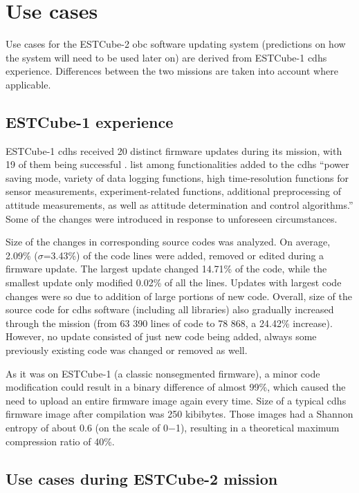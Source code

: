 \newpage
\section{Use cases}
\label{s:usecases}

Use cases for the ESTCube-2 \gls{obc} software updating system (predictions on how the system will need to be used later on) are derived from ESTCube-1 \gls{cdhs} experience. Differences between the two missions are taken into account where applicable.

\subsection{ESTCube-1 experience}

ESTCube-1 \gls{cdhs} received 20 distinct firmware updates during its mission, with 19 of them being successful \cite{Suenter2016}. \textcite{Slavinskis2015} list among functionalities added to the \gls{cdhs} ``power saving mode, variety of data logging functions, high time-resolution functions for sensor measurements, experiment-related functions, additional preprocessing of attitude measurements, as well as attitude determination and control algorithms.'' Some of the changes were introduced in response to unforeseen circumstances.

Size of the changes in corresponding source codes was analyzed. On average, 2.09\% ($\sigma$=3.43\%) of the code lines were added, removed or edited during a firmware update. The largest update changed 14.71\% of the code, while the smallest update only modified 0.02\% of all the lines. Updates with largest code changes were so due to addition of large portions of new code. Overall, size of the source code for \gls{cdhs} software (including all libraries) also gradually increased through the mission (from 63 390 lines of code to 78 868, a 24.42\% increase). However, no update consisted of just new code being added, always some previously existing code was changed or removed as well.

As it was on ESTCube-1 (a classic nonsegmented firmware), a minor code modification could result in a binary difference of almost 99\%, which caused the need to upload an entire firmware image again every time. Size of a typical \gls{cdhs} firmware image after compilation was 250 kibibytes. Those images had a Shannon entropy of about 0.6 (on the scale of 0$-$1), resulting in a theoretical maximum compression ratio of 40\%. \cite{Suenter2016}

\subsection{Use cases during ESTCube-2 mission}

